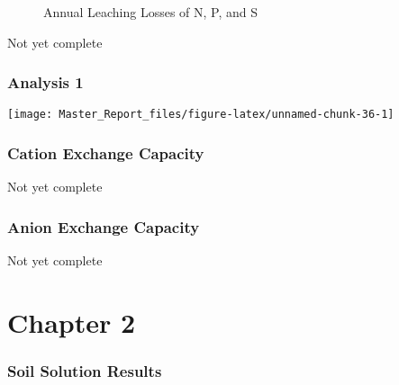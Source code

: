 \documentclass[
]{article}
\begin{document}
\begin{figure}[H]

{\centering {}\newline{}

}

\caption{Annual Leaching Losses of N, P, and S}\label{fig:unnamed-chunk-34}
\end{figure}

Not yet complete

\hypertarget{analysis-1}{%
\subsubsection{Analysis 1}\label{analysis-1}}

\begin{center}\texttt{[image: Master\_Report\_files/figure-latex/unnamed-chunk-36-1]} \end{center}

\hypertarget{cation-exchange-capacity}{%
\subsubsection{Cation Exchange
Capacity}\label{cation-exchange-capacity}}

Not yet complete

\hypertarget{anion-exchange-capacity}{%
\subsubsection{Anion Exchange Capacity}\label{anion-exchange-capacity}}

Not yet complete

\hypertarget{chapter-2}{%
\section{Chapter 2}\label{chapter-2}}

\newpage 
\tableofcontents
\listoffigures
\listoftables
\newpage

\hypertarget{soil-solution-results-1}{%
\subsubsection{Soil Solution Results}\label{soil-solution-results-1}}
\end{document}
